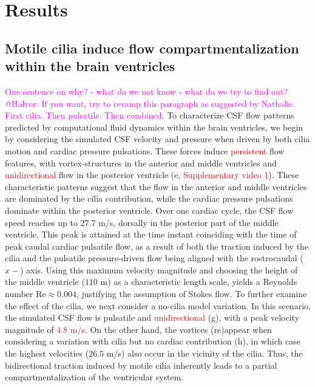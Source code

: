 \documentclass[fleqn]{wlscirep}
\newcommand{\mer}[1]{\textcolor{magenta}{#1}}
\newcommand{\fixme}[1]{\textcolor{red}{#1}}
\begin{document}
\section*{Results}\label{sec:results}

\subsection*{Motile cilia induce flow compartmentalization within the brain ventricles}

\mer{One sentence on why? - what do we not know - what do we try to
  find out?} \mer{@Halvor: If you want, try to revamp this paragraph
  as suggested by Nathalie. First cilia. Then pulsatile. Then
  combined.} To characterize CSF flow patterns predicted by
computational fluid dynamics within the brain ventricles, we begin by
considering the simulated CSF velocity and pressure when driven by
both cilia motion and cardiac pressure pulsations. These forces induce
\fixme{persistent} flow features, with vortex-structures in the
anterior and middle ventricles and \fixme{unidirectional} flow in the
posterior ventricle (e,
\fixme{Supplementary video 1}). These characteristic patterns suggest
that the flow in the anterior and middle ventricles are dominated by
the cilia contribution, while the cardiac pressure pulsations dominate
within the posterior ventricle. Over one cardiac cycle, the CSF flow
speed reaches up to 27.7 \textmu m/s, dorsally in the posterior part
of the middle ventricle. This peak is attained at the time instant
coinciding with the time of peak caudal cardiac pulsatile flow, as a
result of both the traction induced by the cilia and the pulsatile
pressure-driven flow being aligned with the rostrocaudal ($x-$)
axis. Using this maximum velocity magnitude and choosing the height of
the middle ventricle ($110$ \textmu m) as a characteristic length
scale, yields a Reynolds number $\mathrm{Re} \approx 0.004$,
justifying the assumption of Stokes flow. To further examine the
effect of the cilia, we next consider a no-cilia model variation. In
this scenario, the simulated CSF flow is pulsatile and
\fixme{unidirectional} (g), with a peak velocity
magnitude of \fixme{$4.8$ \textmu m/s}. On the other hand, the
vortices (re)appear when considering a variation with cilia but no
cardiac contribution (h), in which case the highest
velocities ($26.5$ \textmu m/s) also occur in the vicinity of the
cilia. Thus, the bidirectional traction induced by motile cilia
inherently leads to a partial compartmentalization of the ventricular
system.
\end{document}

